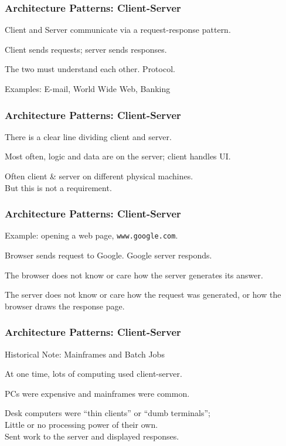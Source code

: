 \begin{frame}
\frametitle{Architecture Patterns: Client-Server}

\begin{changemargin}{1cm}

Client and Server communicate via a request-response pattern.

Client sends requests; server sends responses.

The two must understand each other. Protocol.

Examples: E-mail, World Wide Web, Banking

\end{changemargin}
\end{frame}


\begin{frame}
\frametitle{Architecture Patterns: Client-Server}

\begin{changemargin}{1cm}

There is a clear line dividing client and server.

Most often, logic and data are on the server; client handles UI.

Often client \& server on different physical machines.\\
\quad But this is not a requirement.

\end{changemargin}
\end{frame}

\begin{frame}
\frametitle{Architecture Patterns: Client-Server}

\begin{changemargin}{1cm}

Example: opening a web page, \texttt{www.google.com}.

Browser sends request to Google. Google server responds.

The browser does not know or care how the server generates its answer.

The server does not know or care how the request was generated, or how the browser draws the response page.

\end{changemargin}
\end{frame}

\begin{frame}
\frametitle{Architecture Patterns: Client-Server}

\begin{changemargin}{1cm}
Historical Note: Mainframes and Batch Jobs

At one time, lots of computing used client-server.

PCs were expensive and mainframes were common. 

Desk computers were ``thin clients'' or ``dumb terminals'';\\
\quad Little or no processing power of their own.\\
\quad Sent work to the server and displayed responses.


\end{changemargin}
\end{frame}

